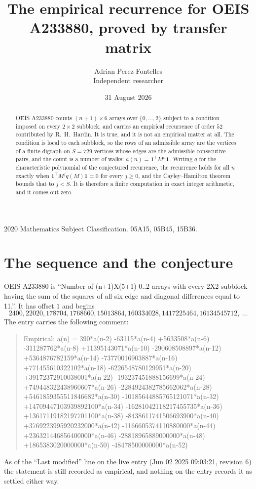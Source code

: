 \documentclass[11pt,a4paper]{article}
\title{The empirical recurrence for OEIS A233880, proved by transfer matrix}
\author{Adrian Perez Fontelles\\ \small Independent researcher}
\date{31 August 2026}
\theoremstyle{plain}
\theoremstyle{definition}
\begin{document}
\maketitle

\begin{abstract}
OEIS A233880 counts $(n+1)\times6$ arrays over $\{0,\dots,2\}$ subject to a condition imposed on
every $2\times2$ subblock, and carries an empirical recurrence of order $52$ contributed
by R.~H.~Hardin. It is true, and it is not an empirical matter at all. The condition is local
to each subblock, so the rows of an admissible array are the vertices of a finite digraph
on $S=729$ vertices whose edges are the admissible consecutive pairs, and the count is a
number of walks: $a(n)=\mathbf{1}^{\!\top}M^{n}\mathbf{1}$. Writing $q$
for the characteristic polynomial of the conjectured recurrence, the recurrence holds for all
$n$ exactly when $\mathbf{1}^{\!\top}M^{j}q(M)\mathbf{1}=0$ for every $j\ge0$, and the
Cayley--Hamilton theorem bounds that to $j<S$. It is therefore a finite computation in exact
integer arithmetic, and it comes out zero.
\end{abstract}

\noindent\small 2020 Mathematics Subject Classification. 05A15, 05B45, 15B36.\normalsize

\section{The sequence and the conjecture}

OEIS A233880 is ``Number of (n+1)X(5+1) 0..2 arrays with every 2X2 subblock having the sum of the squares of all six edge and diagonal differences equal to 11.''. It has offset $1$ and begins
\[
2400, 22020, 178704, 1768660, 15013864, 160334028, 1417225464, 16134545712,\ \dots
\]
The entry carries the following comment:
\begin{quote}\small
Empirical: a(n) = 390*a(n-2) -63115*a(n-4) +5633508*a(n-6) -311287762*a(n-8) +11395143071*a(n-10) -290608508897*a(n-12) +5364876782159*a(n-14) -73770016903887*a(n-16) +771455610322102*a(n-18) -6226548780129951*a(n-20) +39172372910038001*a(n-22) -193237451888156699*a(n-24) +749448322438960607*a(n-26) -2284924382785662062*a(n-28) +5461859355511846682*a(n-30) -10185644885765121071*a(n-32) +14709447103939892100*a(n-34) -16281042118217455735*a(n-36) +13617119182197701100*a(n-38) -8438611741506693900*a(n-40) +3769223995920232000*a(n-42) -1166605374110880000*a(n-44) +236321446856400000*a(n-46) -28818965889000000*a(n-48) +1865383020000000*a(n-50) -48478500000000*a(n-52)
\end{quote}
As of the ``Last modified'' line on the live entry (Jun 02 2025 09:03:21, revision 6) the statement is
still recorded as empirical, and nothing on the entry records it as settled either way.
\end{document}
